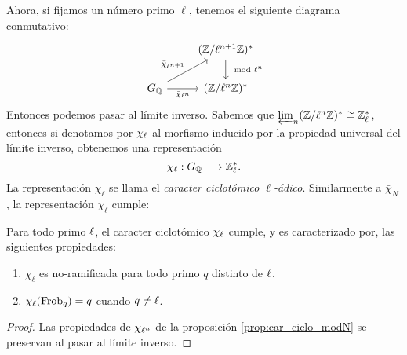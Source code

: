 Ahora, si fijamos un n\'umero primo $\ell$, tenemos el siguiente diagrama conmutativo:
\[
  \begin{tikzcd}
     & (\ZZ/\ell^{n+1}\ZZ)^* \arrow[d,"\mod \ell^n"]\\
     \GQ \arrow[ru,"\bar{\chi}_{\ell^{n+1}}"] \arrow[r,"\bar{\chi}_{\ell^n}"'] &
     (\ZZ/\ell^n\ZZ)^*
  \end{tikzcd}
\]
Entonces podemos pasar al l\'imite inverso. Sabemos que $\varprojlim_n (\mathbb{Z}/\ell^n\mathbb{Z})^*\cong\mathbb{Z}^*_{\ell}$, entonces si denotamos por $\chi_{\ell}$ al morfismo inducido por la propiedad universal del l\'imite inverso, obtenemos una representaci\'on
\[
  \chi_{\ell}:G_{\mathbb{Q}}\longrightarrow \mathbb{Z}^*_{\ell}.
\]
La representaci\'on $\chi_{\ell}$ se llama el \emph{caracter ciclot\'omico $\ell$-\'adico}. Similarmente a $\bar{\chi}_N$, la representaci\'on $\chi_{\ell}$ cumple:

\begin{prop}\label{prop:chiell} Para todo primo $\ell$, el caracter ciclot\'omico $\chi_{\ell}$ cumple, y es caracterizado   por, las siguientes propiedades:
\begin{enumerate}[label=\roman*)]
  \item $\chi_{\ell}$ es no-ramificada para todo primo $q$ distinto de $\ell$.
  \item $\chi_{\ell}(\mathrm{Frob}_q)=q$ cuando $q\neq\ell$.
\end{enumerate}
\end{prop}
\begin{proof}
  Las propiedades de $\bar{\chi}_{\ell^n}$ de la proposici\'on \ref{prop:car_ciclo_modN} se preservan al pasar al l\'imite inverso.
\end{proof}

